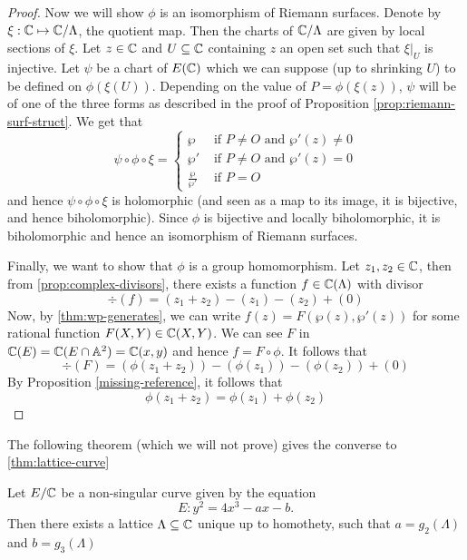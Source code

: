 \begin{proof}
	Now we will show $\phi$ is an isomorphism of Riemann surfaces.
	Denote by $\xi: \mathbb{C} \mapsto \mathbb{C}/\Lambda$, the quotient map.
	Then the charts of $\mathbb{C}/\Lambda$ are given by local sections of $\xi$.
	Let $z \in \mathbb{C}$ and $U \subseteq \mathbb{C}$ containing $z$ an open set such that 
	$\xi\vert_U$ is injective. Let $\psi$ be a chart of $E(\mathbb{C})$
	which we can suppose (up to shrinking $U$) to be defined on
	$\phi(\xi(U))$.
	Depending on the value of $P = \phi(\xi(z))$, $\psi$ will be of one of the
	three forms as described in the proof of 
	Proposition \ref{prop:riemann-surf-struct}.
	We get that
	\begin{equation*}
		\psi\circ\phi\circ\xi = 
		\begin{cases}
			\wp &\textrm{ if } P \neq O\textrm{ and }\wp'(z) \neq 0\\
			\wp' &\textrm{ if } P \neq O\textrm{ and }\wp'(z) = 0\\
			\frac{\wp}{\wp'} &\textrm{ if }P = O
		\end{cases}
	\end{equation*}
	and hence $\psi\circ\phi\circ\xi$ is holomorphic (and seen as a map to its
	image, it is bijective, and hence biholomorphic). Since $\phi$ is
	bijective and locally biholomorphic, it is
	biholomorphic and hence an isomorphism of Riemann surfaces.
	
	Finally, we want to show that $\phi$ is a group homomorphism.
	Let $z_1, z_2 \in \mathbb{C}$, then from \ref{prop:complex-divisors}, there exists
	a function $f \in \mathbb{C}(\Lambda)$ with divisor
	\begin{equation*}
		\div(f) = (z_1 + z_2) - (z_1) - (z_2) + (0)
	\end{equation*}
	Now, by \ref{thm:wp-generates}, we can write $f(z) = F(\wp(z), \wp'(z))$ for
	some rational function $F(X, Y) \in \mathbb{C}(X, Y)$. We can see $F$ in
	$\mathbb{C}(E) = \mathbb{C}(E\cap \mathbb{A}^2) = \mathbb{C}(x, y)$
	and hence $f = F \circ \phi$. It follows that
	\begin{equation*}
		\div (F) = (\phi(z_1 + z_2)) - (\phi(z_1)) - (\phi(z_2)) + (0)
	\end{equation*}
	By Proposition \ref{missing-reference}, it follows that
	\begin{equation*}
		\phi(z_1 + z_2) = \phi(z_1) + \phi(z_2)
	\end{equation*}
\end{proof}

The following theorem (which we will not prove) gives the converse to \ref{thm:lattice-curve}

\begin{theorem}
	\label{thm:curve-lattice}
	Let $E/\mathbb{C}$ be a non-singular curve given by the equation
	\begin{equation*}
		E: y^2 = 4x^3 - ax - b.
	\end{equation*} 
	Then there exists a lattice
	$\Lambda \subseteq \mathbb{C}$ unique up to homothety, such that
	$a = g_2(\Lambda)$ and $b = g_3(\Lambda)$
\end{theorem}

